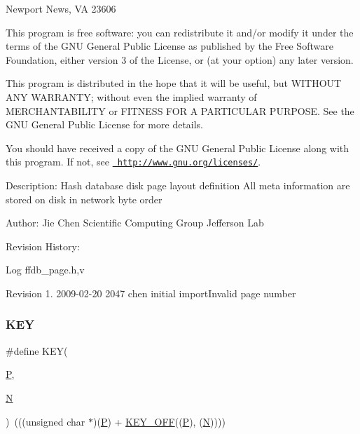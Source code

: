 Newport News, VA 23606

This program is free software\+: you can redistribute it and/or modify it under the terms of the G\+NU General Public License as published by the Free Software Foundation, either version 3 of the License, or (at your option) any later version.

This program is distributed in the hope that it will be useful, but W\+I\+T\+H\+O\+UT A\+NY W\+A\+R\+R\+A\+N\+TY; without even the implied warranty of M\+E\+R\+C\+H\+A\+N\+T\+A\+B\+I\+L\+I\+TY or F\+I\+T\+N\+E\+SS F\+OR A P\+A\+R\+T\+I\+C\+U\+L\+AR P\+U\+R\+P\+O\+SE. See the G\+NU General Public License for more details.

You should have received a copy of the G\+NU General Public License along with this program. If not, see \href{http://www.gnu.org/licenses/}{\texttt{ http\+://www.\+gnu.\+org/licenses/}}. 

 Description\+: Hash database disk page layout definition All meta information are stored on disk in network byte order

Author\+: Jie Chen Scientific Computing Group Jefferson Lab

Revision History\+: \begin{DoxyParagraph}{Log}
ffdb\+\_\+page.\+h,v 
\end{DoxyParagraph}
Revision 1. 2009-\/02-\/20 2047 chen initial import\+Invalid page number \mbox{\label{adat-devel_2other__libs_2filedb_2filehash_2ffdb__page_8h_ae2cc2cb1951dd8443e37a2e247dc7c83}} 
\subsubsection{\texorpdfstring{KEY}{KEY}}
{\footnotesize\ttfamily \#define K\+EY(\begin{DoxyParamCaption}\item[{}]{\mbox{\hyperlink{adat__devel_2lib_2hadron_2operator__name__util_8cc_aef94be98e2c9e4a4dece75f60ca9792c}{P}},  }\item[{}]{\mbox{\hyperlink{adat__devel_2lib_2hadron_2operator__name__util_8cc_a7722c8ecbb62d99aee7ce68b1752f337}{N}} }\end{DoxyParamCaption})~(((unsigned char $\ast$)(\mbox{\hyperlink{adat__devel_2lib_2hadron_2operator__name__util_8cc_aef94be98e2c9e4a4dece75f60ca9792c}{P}}) + \mbox{\hyperlink{adat__devel_2other__libs_2filedb_2filehash_2ffdb__page_8h_a2be5a2f1fdc94395dce82862134bf2b0}{K\+E\+Y\+\_\+\+O\+FF}}((\mbox{\hyperlink{adat__devel_2lib_2hadron_2operator__name__util_8cc_aef94be98e2c9e4a4dece75f60ca9792c}{P}}), (\mbox{\hyperlink{adat__devel_2lib_2hadron_2operator__name__util_8cc_a7722c8ecbb62d99aee7ce68b1752f337}{N}}))))}

